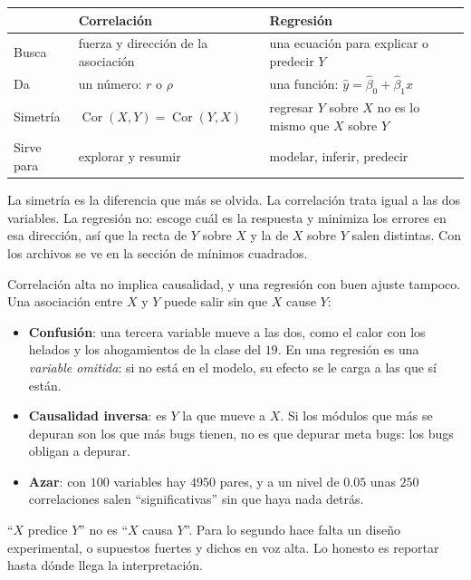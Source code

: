 \documentclass[11pt,letterpaper]{article}
\begin{document}
\begin{center}
\small
\begin{tabular}{l>{\raggedright\arraybackslash}p{5.2cm}%
                 >{\raggedright\arraybackslash}p{5.4cm}}
    \toprule
    & \textbf{Correlación} & \textbf{Regresión} \\
    \midrule
    Busca & fuerza y dirección de la asociación
          & una ecuación para explicar o predecir $Y$ \\
    \addlinespace
    Da & un número: $r$ o $\rho$
       & una función: $\hat{y} = \hat{\beta}_0 + \hat{\beta}_1 x$ \\
    \addlinespace
    Simetría & $\operatorname{Cor}(X, Y) = \operatorname{Cor}(Y, X)$
             & regresar $Y$ sobre $X$ no es lo mismo que $X$ sobre $Y$ \\
    \addlinespace
    Sirve para & explorar y resumir & modelar, inferir, predecir \\
    \bottomrule
\end{tabular}
\end{center}

La simetría es la diferencia que más se olvida. La correlación trata
igual a las dos variables. La regresión no: escoge cuál es la respuesta
y minimiza los errores en esa dirección, así que la recta de $Y$ sobre
$X$ y la de $X$ sobre $Y$ salen distintas. Con los archivos se ve en la
sección de mínimos cuadrados.

\begin{ojo}
    Correlación alta no implica causalidad, y una regresión con buen
    ajuste tampoco. Una asociación entre $X$ y $Y$ puede salir sin que
    $X$ cause $Y$:
    \begin{itemize}[itemsep=0.2em]
        \item \textbf{Confusión}: una tercera variable mueve a las dos,
              como el calor con los helados y los ahogamientos de la
              clase del $19$. En una regresión es una \emph{variable
              omitida}: si no está en el modelo, su efecto se le carga
              a las que sí están.
        \item \textbf{Causalidad inversa}: es $Y$ la que mueve a $X$.
              Si los módulos que más se depuran son los que más bugs
              tienen, no es que depurar meta bugs: los bugs obligan a
              depurar.
        \item \textbf{Azar}: con $100$ variables hay $4950$ pares, y a
              un nivel de $0.05$ unas $250$ correlaciones salen
              ``significativas'' sin que haya nada detrás.
    \end{itemize}
    ``$X$ predice $Y$'' no es ``$X$ causa $Y$''. Para lo segundo hace
    falta un diseño experimental, o supuestos fuertes y dichos en voz
    alta. Lo honesto es reportar hasta dónde llega la interpretación.
\end{ojo}
\end{document}
